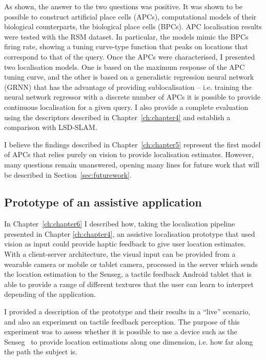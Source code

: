 As shown, the answer to the two questions was positive. It was shown to be possible to construct artificial place cells (APCs), computational models of their biological counterparts, the biological place cells (BPCs). APC localisation results were tested with the RSM dataset. In particular, the models mimic the BPCs firing rate, showing a tuning curve-type function that peaks on locations that correspond to that of the query. Once the APCs were characterised, I presented two localisation models. One is based on the maximum response of the APC tuning curve, and the other is based on a generalistic regression neural network (GRNN) that has the advantage of providing sublocalisation -- i.e. training the neural network regressor with a discrete number of APCs it is possible to provide continuous localisation for a given query. I also provide a complete evaluation using the descriptors described in Chapter~\ref{ch:chapter4} and establish a comparison with LSD-SLAM.

I believe the findings described in Chapter~\ref{ch:chapter5} represent the first model of APCs that relies purely on vision to provide localisation estimates. However, many questions remain unanswered, opening many lines for future work that will be described in Section~\ref{sec:futurework}. 

\subsection{Prototype of an assistive application}

In Chapter~\ref{ch:chapter6} I described how, taking the localisation pipeline presented in Chapter \ref{ch:chapter4}, an assistive localisation prototype that used vision as input could provide haptic feedback to give user location estimates. With a client-server architecture, the visual input can be provided from a wearable camera or mobile or tablet camera, processed in the server which sends the location estimation to the Senseg\texttrademark, a tactile feedback Android tablet that is able to provide a range of different textures that the user can learn to interpret depending of the application.

I provided a description of the prototype and their results in a ``live'' scenario, and also an experiment on tactile feedback perception. The purpose of this experiment was to assess whether it is possible to use a device such as the Senseg\texttrademark~  to provide location estimations along one dimension, i.e. how far along the path the subject is. 

